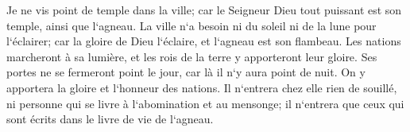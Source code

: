 \verse Je ne vis point de temple dans la ville; car le Seigneur Dieu tout puissant est son temple, ainsi que l`agneau. 
\verse La ville n`a besoin ni du soleil ni de la lune pour l`éclairer; car la gloire de Dieu l`éclaire, et l`agneau est son flambeau. 
\verse Les nations marcheront à sa lumière, et les rois de la terre y apporteront leur gloire. 
\verse Ses portes ne se fermeront point le jour, car là il n`y aura point de nuit. 
\verse On y apportera la gloire et l`honneur des nations. 
\verse Il n`entrera chez elle rien de souillé, ni personne qui se livre à l`abomination et au mensonge; il n`entrera que ceux qui sont écrits dans le livre de vie de l`agneau. 

